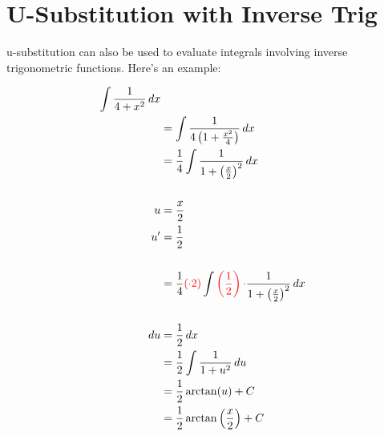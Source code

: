 \newpage

\section{U-Substitution with Inverse Trig}
\noindent u-substitution can also be used to evaluate integrals involving 
inverse trigonometric functions. Here's an example:

\begin{framed}
  \begin{align*}
    \int \frac{1}{4+x^2} \, dx\\
    &= \int \frac{1}{4\left(1+\frac{x^2}{4}\right)} \, dx\\
    &= \frac{1}{4} \int \frac{1}{1 + \left(\frac{x}{2}\right)^2} \, dx\\\\
    u&=\frac{x}{2}\\
    u'&=\frac{1}{2}\\\\
    &= \frac{1}{4} \textcolor{red}{(\cdot 2)} \int 
    \textcolor{red}{\left(\frac{1}{2}\right) \cdot }\frac{1}{1 
    + \left(\frac{x}{2}\right)^2} \, dx\\\\
    du &= \frac{1}{2} \, dx\\
    &= \frac{1}{2} \int \frac{1}{1+u^2} \, du\\
    &= \frac{1}{2} \operatorname{arctan} (u) + C\\
    &= \frac{1}{2} \operatorname{arctan} \left(\frac{x}{2}\right) + C
    \end{align*}
\end{framed}
